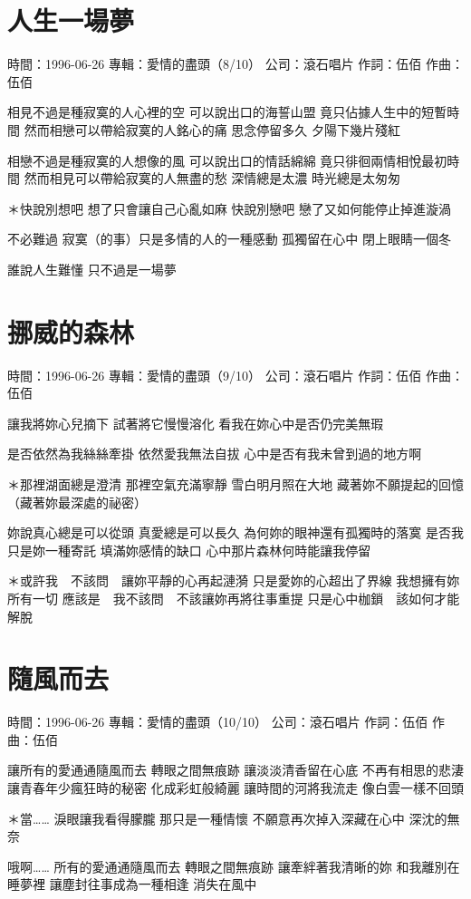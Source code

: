 \documentclass[UTF8,a4paper,oneside,twocolumn,12pt]{ctexbook}
\newcommand{\infopair}[2]{\textbullet #1：#2}
\newcommand{\zc}[1][伍佰]{\infopair{作詞}{#1}}
\newcommand{\zq}[1][伍佰]{\infopair{作曲}{#1}}
\newcommand{\zj}[1]{\infopair{專輯}{#1}}
\newcommand{\sj}[1]{\infopair{時間}{#1}}
\newcommand{\gs}[1]{\infopair{公司}{#1}}
\newenvironment{info}{\begin{flushleft}\kaishu
	}
	{\end{flushleft}\normalsize\yahei\par}
\newenvironment{lyric}{
	}
{}
\begin{document}
\section{人生一場夢}
\begin{info}
	\sj{1996-06-26}
	\zj{愛情的盡頭（8/10）}
	\gs{滾石唱片}
	\zc
	\zq
\end{info}
\begin{lyric}
	相見不過是種寂寞的人心裡的空
	可以說出口的海誓山盟 竟只佔據人生中的短暫時間
	然而相戀可以帶給寂寞的人銘心的痛
	思念停留多久 夕陽下幾片殘紅

	相戀不過是種寂寞的人想像的風
	可以說出口的情話綿綿 竟只徘徊兩情相悅最初時間
	然而相見可以帶給寂寞的人無盡的愁
	深情總是太濃 時光總是太匆匆

	＊快說別想吧
	想了只會讓自己心亂如麻
	快說別戀吧
	戀了又如何能停止掉進漩渦

	不必難過 寂寞（的事）只是多情的人的一種感動
	孤獨留在心中 閉上眼睛一個冬

	誰說人生難懂 只不過是一場夢
\end{lyric}

\section{挪威的森林}
\begin{info}
	\sj{1996-06-26}
	\zj{愛情的盡頭（9/10）}
	\gs{滾石唱片}
	\zc
	\zq
\end{info}
\begin{lyric}
	讓我將妳心兒摘下
	試著將它慢慢溶化
	看我在妳心中是否仍完美無瑕

	是否依然為我絲絲牽掛
	依然愛我無法自拔
	心中是否有我未曾到過的地方啊

	＊那裡湖面總是澄清
	那裡空氣充滿寧靜
	雪白明月照在大地
	藏著妳不願提起的回憶
	（藏著妳最深處的祕密）

	妳說真心總是可以從頭
	真愛總是可以長久
	為何妳的眼神還有孤獨時的落寞
	是否我只是妳一種寄託
	填滿妳感情的缺口
	心中那片森林何時能讓我停留

	＊或許我　不該問　讓妳平靜的心再起漣漪
	只是愛妳的心超出了界線
	我想擁有妳所有一切
	應該是　我不該問　不該讓妳再將往事重提
	只是心中枷鎖　該如何才能解脫
\end{lyric}

\section{隨風而去}
\begin{info}
	\sj{1996-06-26}
	\zj{愛情的盡頭（10/10）}
	\gs{滾石唱片}
	\zc
	\zq
\end{info}
\begin{lyric}
	讓所有的愛通通隨風而去
	轉眼之間無痕跡
	讓淡淡清香留在心底
	不再有相思的悲淒
	讓青春年少瘋狂時的秘密
	化成彩虹般綺麗
	讓時間的河將我流走
	像白雲一樣不回頭

	＊當……
	淚眼讓我看得朦朧
	那只是一種情懷
	不願意再次掉入深藏在心中
	深沈的無奈

	哦啊……
	所有的愛通通隨風而去
	轉眼之間無痕跡
	讓牽絆著我清晰的妳
	和我離別在睡夢裡
	讓塵封往事成為一種相逢
	消失在風中
\end{lyric}
\end{document}
